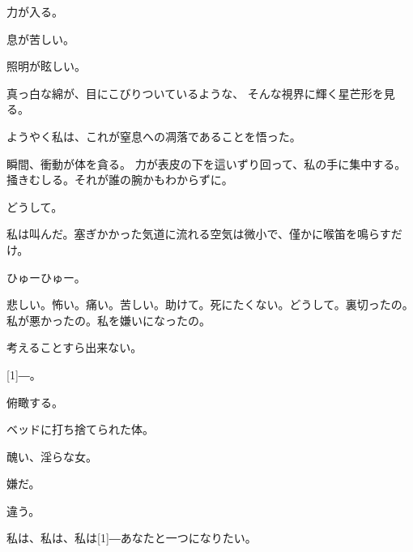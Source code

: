 \documentclass[../IHMain]{subfiles}
\begin{document}
力が入る。

息が苦しい。

照明が眩しい。

真っ白な綿が、目にこびりついているような、
そんな視界に輝く星芒形を見る。

ようやく私は、これが窒息への凋落であることを悟った。

瞬間、衝動が体を貪る。
力が表皮の下を這いずり回って、私の手に集中する。
掻きむしる。それが誰の腕かもわからずに。

どうして。

私は叫んだ。塞ぎかかった気道に流れる空気は微小で、僅かに喉笛を鳴らすだけ。

ひゅーひゅー。

悲しい。怖い。痛い。苦しい。助けて。死にたくない。どうして。裏切ったの。
私が悪かったの。私を嫌いになったの。

考えることすら出来ない。

\scalebox{3}[1]{―}。

俯瞰する。

ベッドに打ち捨てられた体。

醜い、淫らな女。

嫌だ。

違う。

私は、私は、私は\scalebox{3}[1]{―}あなたと一つになりたい。\\
\end{document}
